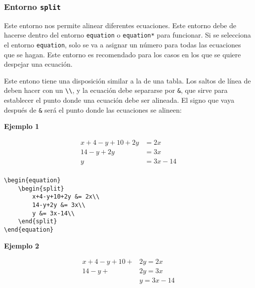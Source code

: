 \subsubsection{Entorno \texttt{split}}

Este entorno nos permite alinear diferentes ecuaciones. Este entorno debe de hacerse dentro del entorno \texttt{equation} o \texttt{equation*} para funcionar. Si se selecciona el entorno \texttt{equation}, solo se va a asignar un número para todas las ecuaciones que se hagan. Este entorno es recomendado para los casos en los que se quiere despejar una ecuación.

Este entono tiene una disposición similar a la de una tabla. Los saltos de línea de deben hacer con un \verb|\\|, y la ecuación debe separarse por \verb|&|, que sirve para establecer el punto donde una ecuación debe ser alineada. El signo que vaya después de \verb|&| será el punto donde las ecuaciones se alineen:

\textbf{Ejemplo 1}

\begin{equation}
	\begin{split}
 		x+4-y+10+2y &= 2x\\
 		14-y+2y &= 3x\\
 		y &= 3x-14\\
	\end{split}
\end{equation}

\begin{myquote}
	\begin{lstlisting}
\begin{equation}
	\begin{split}
		x+4-y+10+2y &= 2x\\
		14-y+2y &= 3x\\
		y &= 3x-14\\
	\end{split}
\end{equation}
	\end{lstlisting}
\end{myquote}

\textbf{Ejemplo 2}

\begin{equation*}
	\begin{split}
		x+4-y+10+ &2y =2x\\
		14-y+ &2y =3x\\
		&y =3x-14\\
	\end{split}
\end{equation*}

